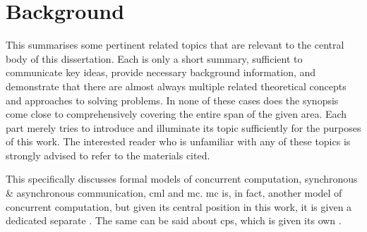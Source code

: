 \chapter{\label{chap:back}Background}
This  summarises some pertinent related topics that are relevant to the central body of this dissertation.  Each is only a short summary, sufficient to communicate key ideas, provide necessary background information, and demonstrate that there are almost always multiple related theoretical concepts and approaches to solving problems.  In none of these cases does the synopsis come close to comprehensively covering the entire span of the given area.  Each part merely tries to introduce and illuminate its topic sufficiently for the purposes of this work.  The interested reader who is unfamiliar with any of these topics is strongly advised to refer to the materials cited.


This  specifically discusses formal models of concurrent computation, synchronous \& asynchronous communication, \gls{cml} and \gls{mc}.  \Gls{mc} is, in fact, another model of concurrent computation, but given its central position in this work, it is given a dedicated separate .  The same can be said about \gls{cps}, which is given its own .




